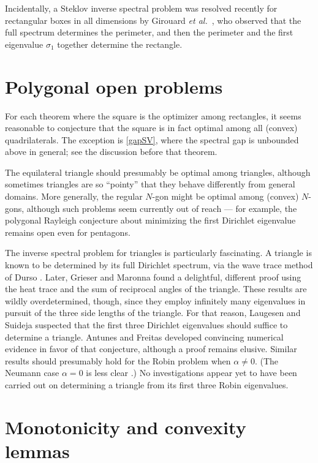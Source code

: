 \documentclass[12pt,reqno]{amsart}
\theoremstyle{definition}
\begin{document}
Incidentally, a Steklov inverse spectral problem was resolved recently for rectangular boxes in all dimensions by Girouard \emph{et al.}\ \cite[Corollary 1.8]{GLPS17}, who observed that the full spectrum determines the perimeter, and then the perimeter and the first eigenvalue $\sigma_1$ together determine the rectangle. 

\section*{Polygonal open problems}
\label{openproblems}

For each theorem where the square is the optimizer among rectangles, it seems reasonable to conjecture that the square is in fact optimal among all (convex) quadrilaterals. The exception is \autoref{gapSV}, where the spectral gap is unbounded above in general; see the discussion before that theorem. 

The equilateral triangle should presumably be optimal among triangles, although sometimes triangles are so  ``pointy'' that they behave differently from general domains. More generally, the regular $N$-gon might be optimal among (convex) $N$-gons, although such problems seem currently out of reach --- for example, the polygonal Rayleigh conjecture about minimizing the first Dirichlet eigenvalue remains open even for pentagons. 

The inverse spectral problem for triangles is particularly fascinating. A triangle is known to be determined by its full Dirichlet spectrum, via the wave trace method of Durso \cite{D90}. Later, Grieser and Maronna \cite{GM13} found a delightful, different proof using the heat trace and the sum of reciprocal angles of the triangle. These results are wildly overdetermined, though, since they employ infinitely many eigenvalues in pursuit of the three side lengths of the triangle. For that reason, Laugesen and Suideja \cite[p.\,17]{LS09} suspected that the first three Dirichlet eigenvalues should suffice to determine a triangle. Antunes and Freitas \cite{AF11} developed convincing numerical evidence in favor of that conjecture, although a proof remains elusive. Similar results should presumably hold for the Robin problem when $\alpha \neq 0$. (The Neumann case $\alpha=0$ is less clear \cite[Section 3c]{AF11}.) No investigations appear yet to have been carried out on determining a triangle from its first three Robin eigenvalues. 

\section{\bf Monotonicity and convexity lemmas}
\label{notation}
\end{document}
